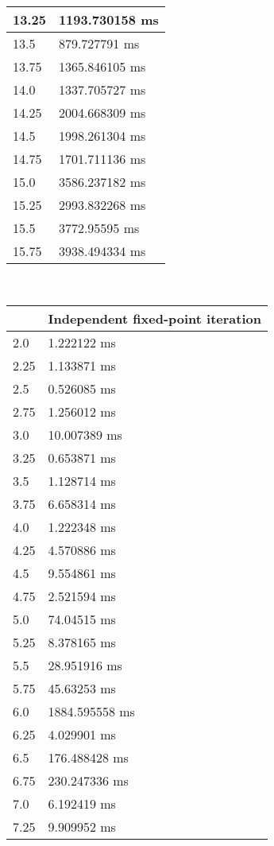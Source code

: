 \begin{multicols}{2}
\begin{tabular}{|l|l|}
		13.25 & 1193.730158 ms \\ \hline
		13.5 & 879.727791 ms \\ \hline
		13.75 & 1365.846105 ms \\ \hline
		14.0 & 1337.705727 ms \\ \hline
		14.25 & 2004.668309 ms \\ \hline
		14.5 & 1998.261304 ms \\ \hline
		14.75 & 1701.711136 ms \\ \hline
		15.0 & 3586.237182 ms \\ \hline
		15.25 & 2993.832268 ms \\ \hline
		15.5 & 3772.95595 ms \\ \hline
		15.75 & 3938.494334 ms \\ \hline
	\end{tabular}\\
	\begin{tabular}{|l|l|}
		\hline
		& Independent fixed-point iteration \\ \hline
		2.0 & 1.222122 ms \\ \hline
		2.25 & 1.133871 ms \\ \hline
		2.5 & 0.526085 ms \\ \hline
		2.75 & 1.256012 ms \\ \hline
		3.0 & 10.007389 ms \\ \hline
		3.25 & 0.653871 ms \\ \hline
		3.5 & 1.128714 ms \\ \hline
		3.75 & 6.658314 ms \\ \hline
		4.0 & 1.222348 ms \\ \hline
		4.25 & 4.570886 ms \\ \hline
		4.5 & 9.554861 ms \\ \hline
		4.75 & 2.521594 ms \\ \hline
		5.0 & 74.04515 ms \\ \hline
		5.25 & 8.378165 ms \\ \hline
		5.5 & 28.951916 ms \\ \hline
		5.75 & 45.63253 ms \\ \hline
		6.0 & 1884.595558 ms \\ \hline
		6.25 & 4.029901 ms \\ \hline
		6.5 & 176.488428 ms \\ \hline
		6.75 & 230.247336 ms \\ \hline
		7.0 & 6.192419 ms \\ \hline
		7.25 & 9.909952 ms \\ \hline

\end{tabular}
\end{multicols}
